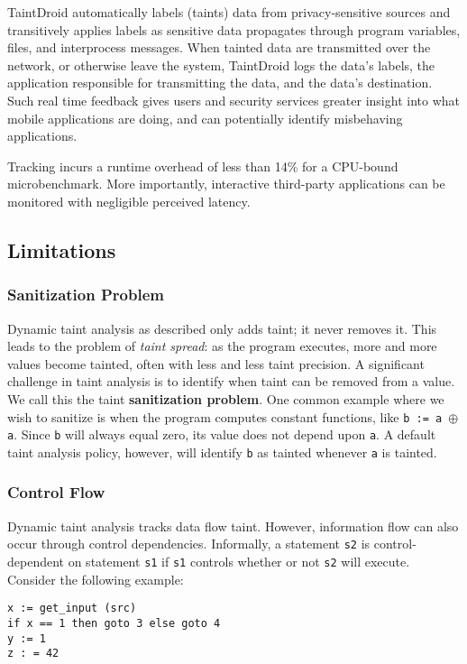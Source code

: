 TaintDroid automatically labels (taints) data from privacy-sensitive sources and transitively applies labels as sensitive data propagates through program variables, files, and interprocess messages. When tainted data are transmitted over the network, or otherwise leave the system, TaintDroid logs the data’s labels, the application responsible for transmitting the data, and the data’s destination. Such real time feedback gives users and security services greater insight into what mobile applications are doing, and can potentially identify misbehaving applications. 

Tracking incurs a runtime overhead of less than 14\% for a CPU-bound microbenchmark. More importantly, interactive third-party applications can be monitored with negligible perceived latency.

\subsection{Limitations}
\subsubsection{Sanitization Problem}
Dynamic taint analysis as described only adds taint; it never removes it. This leads to the problem of \textit{taint spread}: as the program executes, more and more values become tainted, often with less and less taint precision. A significant challenge in taint analysis is to identify when taint can be removed from a value. We call this the taint \textbf{sanitization problem}. One common example where we wish to sanitize is when the program computes constant functions, like \texttt{b := a $\oplus$ a}. Since \texttt{b} will always equal zero, its value does not depend upon \texttt{a}. A default taint analysis policy, however, will identify \texttt{b} as tainted whenever \texttt{a} is tainted.

\subsubsection{Control Flow}
Dynamic taint analysis tracks data flow taint. However, information flow can also occur through control dependencies. Informally, a statement \texttt{s2} is control-dependent on statement \texttt{s1} if \texttt{s1} controls whether or not \texttt{s2} will execute. Consider the following example:

\begin{lstlisting}
x := get_input (src)
if x == 1 then goto 3 else goto 4
y := 1
z : = 42
\end{lstlisting}

